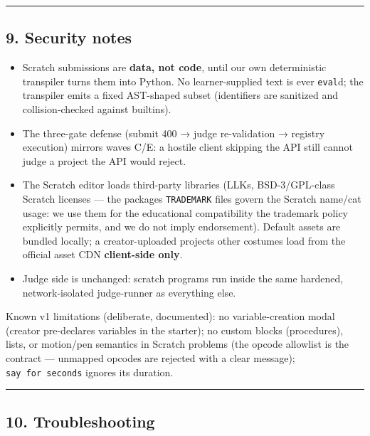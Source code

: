 \documentclass[
]{article}
\providecommand{\tightlist}{%
  \setlength{\itemsep}{0pt}\setlength{\parskip}{0pt}}
\begin{document}
\begin{center}\rule{0.5\linewidth}{0.5pt}\end{center}

\subsection{9. Security notes}\label{9-security-notes}

\begin{itemize}
\tightlist
\item
  Scratch submissions are \textbf{data, not code}, until our own
  deterministic transpiler turns them into Python. No learner-supplied
  text is ever \texttt{eval}\textquotesingle d; the transpiler emits a
  fixed AST-shaped subset (identifiers are sanitized and
  collision-checked against builtins).
\item
  The three-gate defense (submit 400 → judge re-validation → registry
  execution) mirrors waves C/E: a hostile client skipping the API still
  cannot judge a project the API would reject.
\item
  The Scratch editor loads third-party libraries (LLK\textquotesingle s,
  BSD-3/GPL-class Scratch licenses --- the packages\textquotesingle{}
  \texttt{TRADEMARK} files govern the Scratch name/cat usage: we use
  them for the educational compatibility the trademark policy explicitly
  permits, and we do not imply endorsement). Default assets are bundled
  locally; a creator-uploaded project\textquotesingle s other costumes
  load from the official asset CDN \textbf{client-side only}.
\item
  Judge side is unchanged: scratch programs run inside the same
  hardened, network-isolated judge-runner as everything else.
\end{itemize}

Known v1 limitations (deliberate, documented): no variable-creation
modal (creator pre-declares variables in the starter); no custom blocks
(procedures), lists, or motion/pen semantics in Scratch problems (the
opcode allowlist is the contract --- unmapped opcodes are rejected with
a clear message); \texttt{say\ for\ seconds} ignores its duration.

\begin{center}\rule{0.5\linewidth}{0.5pt}\end{center}

\subsection{10. Troubleshooting}\label{10-troubleshooting}
\end{document}
